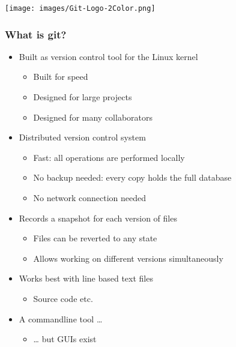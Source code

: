 \documentclass{beamer}
\begin{document}
\begin{frame}[t]
    \vspace{20mm}
    \texttt{[image: images/Git-Logo-2Color.png]}
\end{frame}

\begin{frame}[t]
    \frametitle{What is git?}
    \begin{itemize}
        \item Built as version control tool for the Linux kernel
            \begin{itemize}
                \item Built for speed
                \item Designed for large projects
                \item Designed for many collaborators
            \end{itemize}
        \item Distributed version control system
            \begin{itemize}
                \item Fast: all operations are performed locally
                \item No backup needed: every copy holds the full database
                \item No network connection needed
            \end{itemize}
        \item Records a snapshot for each version of files
            \begin{itemize}
                \item Files can be reverted to any state
                \item Allows working on different versions simultaneously
            \end{itemize}
        \item Works best with line based text files
            \begin{itemize}
                \item Source code etc.
            \end{itemize}
        \item<2> A commandline tool \dots
            \begin{itemize}
                \item \dots{} but GUIs exist 
            \end{itemize}
    \end{itemize}
\end{frame}
\end{document}
